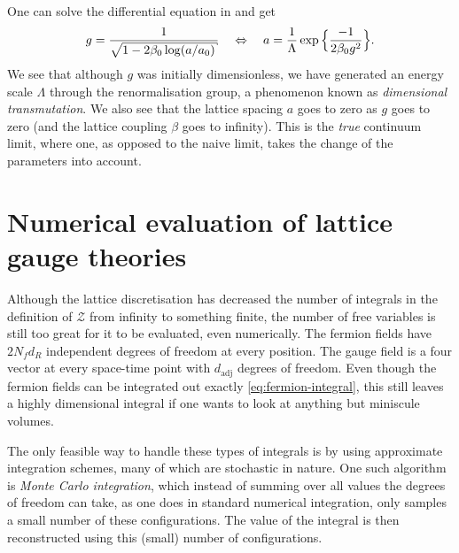 %
One can solve the differential equation in  and get
%
\begin{equation} \label{eq:running-coupling}
  g = \frac{1}{\sqrt{1 - 2\beta_0 \log (a/a_0)}}
    \hskip1em\Leftrightarrow\hskip1em
    a = \frac{1}{\Lambda} \exp\Big\{\frac{-1}{2\beta_0 g^2}\Big\} .
\end{equation}
%
We see that although $g$ was initially dimensionless, we have generated an
energy scale $\Lambda$ through the renormalisation group, a phenomenon known as
\emph{dimensional transmutation}. We also see that the lattice spacing $a$ goes
to zero as $g$ goes to zero (and the lattice coupling $\beta$ goes to infinity).
This is the \emph{true} continuum limit, where one, as opposed to the naive
limit, takes the change of the parameters into account.

\section{Numerical evaluation of lattice gauge theories}
\label{sec:numerical_eval}

Although the lattice discretisation has decreased the number of integrals in the
definition of $\mathcal{Z}$ from infinity to something finite, the number of free
variables is still too great for it to be evaluated, even numerically. The
fermion fields have $2 N_f d_R$ independent degrees of freedom at every
position. The gauge field is a four vector at every space-time point with
$d_{\text{adj}}$ degrees of freedom. Even though the fermion fields can be
integrated out exactly \eqref{eq:fermion-integral}, this still leaves a highly
dimensional integral if one wants to look at anything but miniscule volumes.

The only feasible way to handle these types of integrals is by using approximate
integration schemes, many of which are stochastic in nature. One such algorithm
is \emph{Monte Carlo integration}, which instead of summing over all
values the degrees of freedom can take, as one does in standard numerical
integration, only samples a small number of these configurations. The value of
the integral is then reconstructed using this (small) number of configurations.

